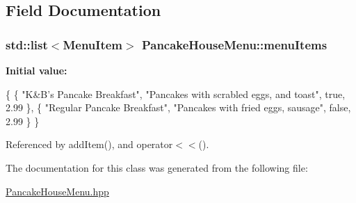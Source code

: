 \subsection{Field Documentation}
\hypertarget{classPancakeHouseMenu_a6fbeb614aa15ade6f89350849ce7a41f}{
\subsubsection[{menu\-Items}]{\setlength{\rightskip}{0pt plus 5cm}std\-::list$<${\bf Menu\-Item}$>$ Pancake\-House\-Menu\-::menu\-Items}}\label{classPancakeHouseMenu_a6fbeb614aa15ade6f89350849ce7a41f}
{\bfseries Initial value\-:}
\begin{DoxyCode}
 \{
          \{
               \textcolor{stringliteral}{"K&B's Pancake Breakfast"},
               \textcolor{stringliteral}{"Pancakes with scrabled eggs, and toast"},
               \textcolor{keyword}{true},
               2.99
          \},
          \{
               \textcolor{stringliteral}{"Regular Pancake Breakfast"},
               \textcolor{stringliteral}{"Pancakes with fried eggs, sausage"},
               \textcolor{keyword}{false},
               2.99
          \}
     \}
\end{DoxyCode}


Referenced by add\-Item(), and operator$<$$<$().



The documentation for this class was generated from the following file\-:\begin{DoxyCompactItemize}
\item 
\hyperlink{PancakeHouseMenu_8hpp}{Pancake\-House\-Menu.\-hpp}\end{DoxyCompactItemize}
